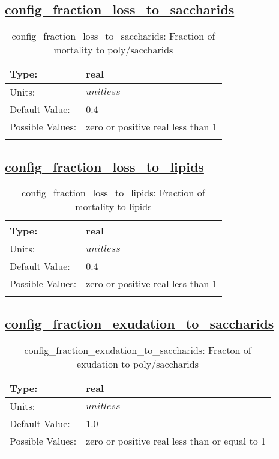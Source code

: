 \subsection[config\_fraction\_loss\_to\_saccharids]{\hyperref[sec:nm_tab_biogeochemistry]{config\_fraction\_loss\_to\_saccharids}}
\label{subsec:nm_sec_config_fraction_loss_to_saccharids}
\begin{center}
\begin{longtable}{| p{2.0in} || p{4.0in} |}
    \hline
    Type: & real \\
    \hline
    Units: & $unitless$ \\
    \hline
    Default Value: & 0.4 \\
    \hline
    Possible Values: & zero or positive real less than 1 \\
    \hline
    \caption{config\_fraction\_loss\_to\_saccharids: Fraction of mortality to poly/saccharids}
\end{longtable}
\end{center}
\subsection[config\_fraction\_loss\_to\_lipids]{\hyperref[sec:nm_tab_biogeochemistry]{config\_fraction\_loss\_to\_lipids}}
\label{subsec:nm_sec_config_fraction_loss_to_lipids}
\begin{center}
\begin{longtable}{| p{2.0in} || p{4.0in} |}
    \hline
    Type: & real \\
    \hline
    Units: & $unitless$ \\
    \hline
    Default Value: & 0.4 \\
    \hline
    Possible Values: & zero or positive real less than 1 \\
    \hline
    \caption{config\_fraction\_loss\_to\_lipids: Fraction of mortality to lipids}
\end{longtable}
\end{center}
\subsection[config\_fraction\_exudation\_to\_saccharids]{\hyperref[sec:nm_tab_biogeochemistry]{config\_fraction\_exudation\_to\_saccharids}}
\label{subsec:nm_sec_config_fraction_exudation_to_saccharids}
\begin{center}
\begin{longtable}{| p{2.0in} || p{4.0in} |}
    \hline
    Type: & real \\
    \hline
    Units: & $unitless$ \\
    \hline
    Default Value: & 1.0 \\
    \hline
    Possible Values: & zero or positive real less than or equal to 1 \\
    \hline
    \caption{config\_fraction\_exudation\_to\_saccharids: Fracton of exudation to poly/saccharids}
\end{longtable}
\end{center}

